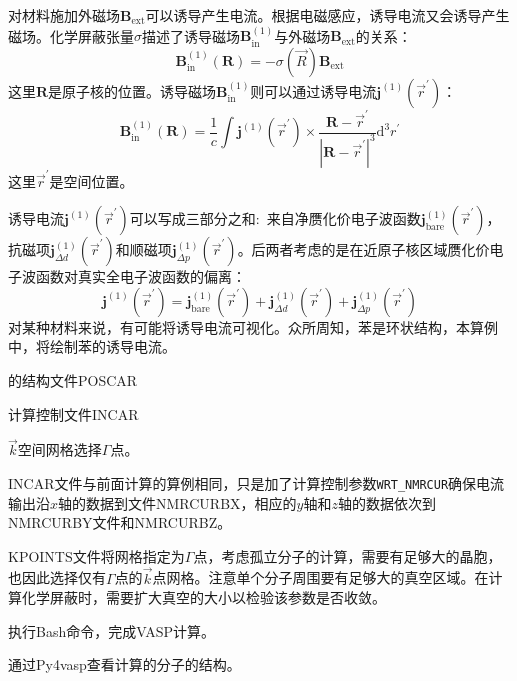 对材料施加外磁场$\mathbf{B}_{\mathrm{ext}}$可以诱导产生电流。根据电磁感应，诱导电流又会诱导产生磁场。化学屏蔽张量$\sigma$描述了诱导磁场$\mathbf{B}_{\mathrm{in}}^{(1)}$与外磁场$\mathbf{B}_{\mathrm{ext}}$的关系：
\begin{displaymath}
	\mathbf{B}_{\mathrm{in}}^{(1)}(\mathbf{R})=-\sigma(\vec R)\mathbf{B}_{\mathrm{ext}}
\end{displaymath}
这里$\mathbf{R}$是原子核的位置。诱导磁场$\mathbf{B}_{\mathrm{in}}^{(1)}$则可以通过诱导电流$\mathbf{j}^{(1)}(\vec r^{\prime})$：
\begin{displaymath}
	\mathbf{B}_{\mathrm{in}}^{(1)}(\mathbf{R})=\dfrac1c\int\mathbf{j}^{(1)}(\vec r^{\prime})\times\dfrac{\mathbf{R}-\vec r^{\prime}}{|\mathbf{R}-\vec r^{\prime}|^3}\mathrm{d}^3r^{\prime}
\end{displaymath}
这里$\vec r^{\prime}$是空间位置。

诱导电流$\mathbf{j}^{(1)}(\vec r^{\prime})$可以写成三部分之和:~来自净赝化价电子波函数$\mathbf{j}_{\mathrm{bare}}^{(1)}(\vec r^{\prime})$，抗磁项$\mathbf{j}_{\Delta d}^{(1)}(\vec r^{\prime})$和顺磁项$\mathbf{j}_{\Delta p}^{(1)}(\vec r^{\prime})$。后两者考虑的是在近原子核区域赝化价电子波函数对真实全电子波函数的偏离：
\begin{displaymath}
	\mathbf{j}^{(1)}(\vec r^{\prime})=\mathbf{j}_{\mathrm{bare}}^{(1)}(\vec r^{\prime})+\mathbf{j}_{\Delta d}^{(1)}(\vec r^{\prime})+\mathbf{j}_{\Delta p}^{(1)}(\vec r^{\prime})
\end{displaymath}
对某种材料来说，有可能将诱导电流可视化。众所周知，苯是环状结构，本算例中，将绘制苯的诱导电流。

的结构文件\textrm{POSCAR}

计算控制文件\textrm{INCAR}

$\vec k$空间网格选择$\Gamma$点。

\textrm{INCAR}文件与前面计算的算例相同，只是加了计算控制参数\texttt{WRT\_NMRCUR}确保电流输出沿$x$轴的数据到文件\textrm{NMRCURBX}，相应的$y$轴和$z$轴的数据依次到\textrm{NMRCURBY}文件和\textrm{NMRCURBZ}。

\textrm{KPOINTS}文件将网格指定为$\Gamma$点，考虑孤立分子的计算，需要有足够大的晶胞，也因此选择仅有$\Gamma$点的$\vec k$点网格。注意单个分子周围要有足够大的真空区域。在计算化学屏蔽时，需要扩大真空的大小以检验该参数是否收敛。

执行\textrm{Bash}命令，完成\textrm{VASP}计算。

通过\textrm{Py4vasp}查看计算的分子的结构。

